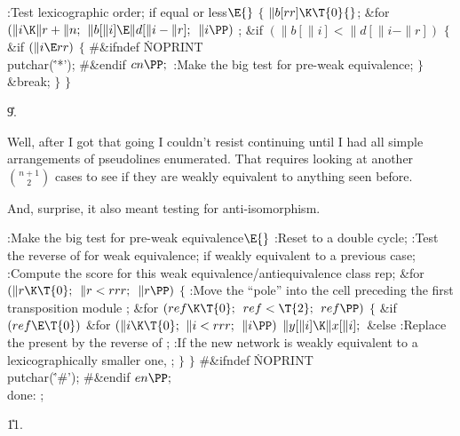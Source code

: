 \B{}:Test lexicographic order;  if equal
or less\X${}\E{}$\6
${}\{{}$\1\6
${}\|b[\\{rr}]\K\T{0}{}$;\6
\&{for} ${}(\|i\K\|r+\|n;{}$ ${}\|b[\|i]\E\|d[\|i-\|r];{}$ ${}\|i\PP){}$\1\5
;\2\6
\&{if} ${}(\|b[\|i]<\|d[\|i-\|r]){}$\5
${}\{{}$\1\6
\&{if} ${}(\|i\E\\{rr}){}$\5
${}\{{}$\6
\8\#\&{ifndef} \.{NOPRINT}\1\6
\\{putchar}(\.{'*'});\6
\8\#\&{endif}\6
${}\\{cn}\PP;{}$\6
:Make the big test for pre-weak equivalence\X;\6
\4${}\}{}$\2\6
\&{break};\6
\4${}\}{}$\2\6
\4${}\}{}$\2\par
\U9.\fi

Well, after I got that going I couldn't resist continuing
until I had
all simple arrangements of pseudolines enumerated. That requires looking at
another $n+1\choose2$ cases to see if they are weakly equivalent to anything
seen before.

And, surprise, it also meant testing for anti-isomorphism.

\Y\B\4:Make the big test for pre-weak equivalence\X${}\E{}$\6
:Reset  to a double cycle\X;\6
:Test the reverse of  for weak equivalence; 
if weakly equivalent to a previous case\X;\6
:Compute the score for this weak equivalence/antiequivalence class rep\X;\6
\&{for} ${}(\|r\K\T{0};{}$ ${}\|r<\\{rrr};{}$ ${}\|r\PP){}$\5
${}\{{}$\1\6
:Move the ``pole'' into the cell preceding the first transposition module%
\X;\6
\&{for} ${}(\\{ref}\K\T{0};{}$ ${}\\{ref}<\T{2};{}$ ${}\\{ref}\PP){}$\5
${}\{{}$\1\6
\&{if} ${}(\\{ref}\E\T{0}){}$\1\6
\&{for} ${}(\|i\K\T{0};{}$ ${}\|i<\\{rrr};{}$ ${}\|i\PP){}$\1\5
${}\|y[\|i]\K\|x[\|i];{}$\2\2\6
\&{else}\1\5
:Replace the present  by the reverse of \X;\2\6
:If the new network is weakly equivalent to a lexicographically smaller
one, \X;\6
\4${}\}{}$\2\6
\4${}\}{}$\2\6
\8\#\&{ifndef} \.{NOPRINT}\6
\\{putchar}(\.{'\#'});\6
\8\#\&{endif}\6
${}\\{en}\PP;{}$\6
\4\\{done}:\5
;\par
\U11.\fi

